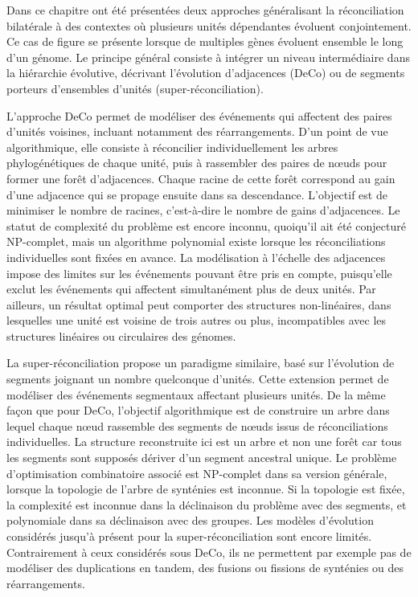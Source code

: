 Dans ce chapitre ont été présentées deux approches généralisant la réconciliation bilatérale à des contextes où plusieurs unités dépendantes évoluent conjointement.
Ce cas de figure se présente lorsque de multiples gènes évoluent ensemble le long d’un génome.
Le principe général consiste à intégrer un niveau intermédiaire dans la hiérarchie évolutive, décrivant l’évolution d’adjacences (DeCo) ou de segments porteurs d’ensembles d’unités (super-réconciliation).

L’approche DeCo permet de modéliser des événements qui affectent des paires d’unités voisines, incluant notamment des réarrangements.
D’un point de vue algorithmique, elle consiste à réconcilier individuellement les arbres phylogénétiques de chaque unité, puis à rassembler des paires de nœuds pour former une forêt d’adjacences.
Chaque racine de cette forêt correspond au gain d’une adjacence qui se propage ensuite dans sa descendance.
L’objectif est de minimiser le nombre de racines, c’est-à-dire le nombre de gains d’adjacences.
Le statut de complexité du problème est encore inconnu, quoiqu’il ait été conjecturé NP-complet, mais un algorithme polynomial existe lorsque les réconciliations individuelles sont fixées en avance.
La modélisation à l’échelle des adjacences impose des limites sur les événements pouvant être pris en compte, puisqu’elle exclut les événements qui affectent simultanément plus de deux unités.
Par ailleurs, un résultat optimal peut comporter des structures non-linéaires, dans lesquelles une unité est voisine de trois autres ou plus, incompatibles avec les structures linéaires ou circulaires des génomes.

La super-réconciliation propose un paradigme similaire, basé sur l’évolution de segments joignant un nombre quelconque d’unités.
Cette extension permet de modéliser des événements segmentaux affectant plusieurs unités.
De la même façon que pour DeCo, l’objectif algorithmique est de construire un arbre dans lequel chaque nœud rassemble des segments de nœuds issus de réconciliations individuelles.
La structure reconstruite ici est un arbre et non une forêt car tous les segments sont supposés dériver d’un segment ancestral unique.
Le problème d’optimisation combinatoire associé est NP-complet dans sa version générale, lorsque la topologie de l’arbre de synténies est inconnue.
Si la topologie est fixée, la complexité est inconnue dans la déclinaison du problème avec des segments, et polynomiale dans sa déclinaison avec des groupes.
Les modèles d’évolution considérés jusqu’à présent pour la super-réconciliation sont encore limités.
Contrairement à ceux considérés sous DeCo, ils ne permettent par exemple pas de modéliser des duplications en tandem, des fusions ou fissions de synténies ou des réarrangements.
